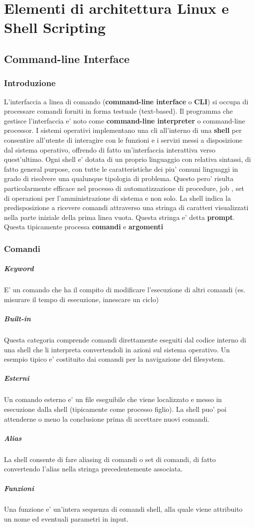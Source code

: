 \section{Elementi di architettura Linux e Shell Scripting}
\subsection{Command-line Interface}
\subsubsection{Introduzione}
L'interfaccia a linea di comando (\textbf{command-line interface} o \textbf{CLI}) si occupa di processare comandi forniti in forma testuale (text-based). 
Il programma che gestisce l'interfaccia e' noto come \textbf{command-line interpreter} o command-line processor. 
I sistemi operativi implementano una cli all'interno di una \textbf{shell} per consentire all'utente
di interagire con le funzioni e i servizi messi a disposizione dal sistema operativo,
offrendo di fatto un'interfaccia interattiva verso quest'ultimo. Ogni shell e' dotata di un proprio linguaggio
con relativa sintassi, di fatto general purpose, con tutte le caratteristiche dei piu'
comuni linguaggi in grado di risolvere una qualunque tipologia di problema. Questo pero' risulta particolarmente
efficace nel processo di automatizzazione di procedure, job , set di operazioni per l'amministrazione di 
sistema e non solo. La shell indica la predisposizione a ricevere comandi attraverso una stringa di caratteri
visualizzati nella parte iniziale della prima linea vuota. Questa stringa e' detta \textbf{prompt}.
Questa tipicamente processa \textbf{comandi} e \textbf{argomenti}

\subsubsection{Comandi}
	\subparagraph{Keyword}
	E' un comando che ha il compito di modificare l'esecuzione di altri comandi
	(es. misurare il tempo di esecuzione, innescare un ciclo)
	\subparagraph{Built-in}
	Questa categoria comprende comandi direttamente eseguiti dal codice interno di una shell che li
	interpreta convertendoli in azioni sul sistema operativo. Un esempio tipico e' costituito dai comandi
	per la navigazione del filesystem.
	\subparagraph{Esterni}
	Un comando esterno e' un file eseguibile che viene localizzato e messo in esecuzione dalla shell
	(tipicamente come processo figlio). La shell puo' poi attenderne o meno la conclusione prima di 
	accettare nuovi comandi.
	\subparagraph{Alias}
	La shell consente di fare aliasing di comandi o set di comandi, di fatto convertendo l'alias nella
	stringa precedentemente associata.
	\subparagraph{Funzioni}
	Una funzione e' un'intera sequenza di comandi shell, alla quale viene attribuito un nome ed eventuali
	parametri in input.


